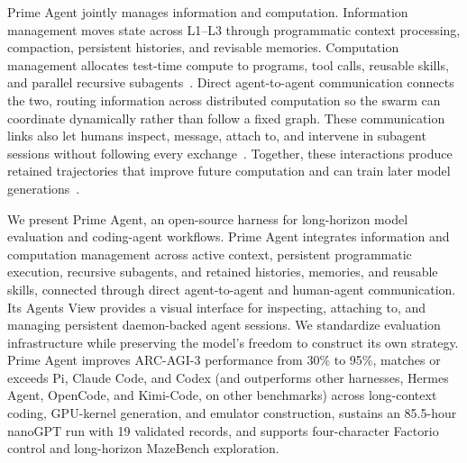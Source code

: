 Prime Agent jointly manages information and computation.
Information management moves state across L1--L3 through programmatic context processing, compaction, persistent histories, and revisable memories.
Computation management allocates test-time compute to programs, tool calls, reusable skills, and parallel recursive subagents~\citep{snell2024scalingtesttime,zhang2025recursivelanguagemodels}.
Direct agent-to-agent communication connects the two, routing information across distributed computation so the swarm can coordinate dynamically rather than follow a fixed graph.
These communication links also let humans inspect, message, attach to, and intervene in subagent sessions without following every exchange~\citep{karten2023interpretablecommunication,li2023theoryofmind}.
Together, these interactions produce retained trajectories that improve future computation and can train later model generations~\citep{zelikman2022star,xu2024agenttrek,pan2024swegym}.

We present Prime Agent, an open-source harness for long-horizon model evaluation and coding-agent workflows.
Prime Agent integrates information and computation management across active context, persistent programmatic execution, recursive subagents, and retained histories, memories, and reusable skills, connected through direct agent-to-agent and human-agent communication.
Its Agents View provides a visual interface for inspecting, attaching to, and managing persistent daemon-backed agent sessions.
We standardize evaluation infrastructure while preserving the model's freedom to construct its own strategy.
Prime Agent improves ARC-AGI-3 performance from 30\% to 95\%, matches or exceeds Pi, Claude Code, and Codex (and outperforms other harnesses, Hermes Agent, OpenCode, and Kimi-Code, on other benchmarks) across long-context coding, GPU-kernel generation, and emulator construction, sustains an 85.5-hour nanoGPT run with 19 validated records, and supports four-character Factorio control and long-horizon MazeBench exploration.
